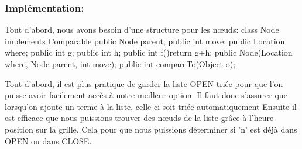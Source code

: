 \documentclass{article}
\begin{document}
\subsubsection{Implémentation:}
\vspace{0.5 cm}

Tout d'abord, nous avons besoin d'une structure pour les nœuds: \newline
class Node implements Comparable {\newline
public Node parent;\newline
public int move;\newline
public Location where;\newline
public int g;\newline
public int h;\newline
public int f(){return g+h;}\newline
public Node(Location where, Node parent, int move);\newline
public int compareTo(Object o);
}\newline


Tout d'abord, il est plus pratique de garder la liste OPEN triée pour que l'on puisse avoir facilement accès à notre meilleur option. Il faut donc s'assurer que lorsqu'on ajoute un terme à la liste, celle-ci soit triée automatiquement  \newline
Ensuite il est efficace que nous puissions trouver des nœuds de la liste grâce à l'heure position sur la grille. Cela pour que nous puissions déterminer si 'n' est déjà dans OPEN ou dans CLOSE.
\newpage
\end{document}

